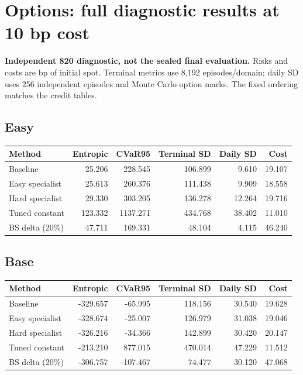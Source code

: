 \documentclass[11pt,a4paper]{article}
\begin{document}
\section{Options: full diagnostic results at 10 bp cost}
\textbf{Independent 820 diagnostic, not the sealed final evaluation.} Risks and costs are bp of initial spot. Terminal metrics use 8,192 episodes/domain; daily SD uses 256 independent episodes and Monte Carlo option marks. The fixed ordering matches the credit tables.

\subsection*{Easy}
\begin{small}
\begin{tabular}{lrrrrr}
\toprule
Method & Entropic & CVaR95 & Terminal SD & Daily SD & Cost \\
\midrule
Baseline & 25.206 & 228.545 & 106.899 & 9.610 & 19.107 \\
Easy specialist & 25.613 & 260.376 & 111.438 & 9.909 & 18.558 \\
Hard specialist & 29.330 & 303.205 & 136.278 & 12.264 & 19.716 \\
Tuned constant & 123.332 & 1137.271 & 434.768 & 38.402 & 11.010 \\
BS delta (20\%) & 47.711 & 169.331 & 48.104 & 4.115 & 46.240 \\
\bottomrule
\end{tabular}
\end{small}\par\medskip

\subsection*{Base}
\begin{small}
\begin{tabular}{lrrrrr}
\toprule
Method & Entropic & CVaR95 & Terminal SD & Daily SD & Cost \\
\midrule
Baseline & -329.657 & -65.995 & 118.156 & 30.540 & 19.628 \\
Easy specialist & -328.674 & -25.007 & 126.979 & 31.038 & 19.046 \\
Hard specialist & -326.216 & -34.366 & 142.899 & 30.420 & 20.147 \\
Tuned constant & -213.210 & 877.015 & 470.014 & 47.229 & 11.512 \\
BS delta (20\%) & -306.757 & -107.467 & 74.477 & 30.120 & 47.068 \\
\bottomrule
\end{tabular}
\end{small}\par\medskip
\end{document}
